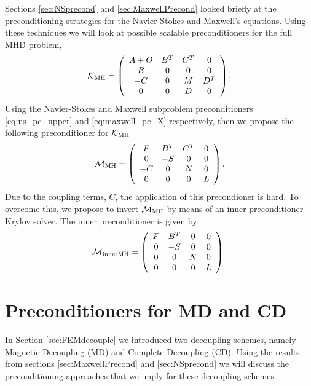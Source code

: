 Sections \ref{sec:NSprecond} and \ref{sec:MaxwellPrecond} looked briefly at the preconditioning strategies for the Navier-Stokes and Maxwell's equations. Using these techniques we will look at possible scalable preconditioners for the full MHD problem,
\begin{equation}
    {\mathcal K}_{\rm MH} = \left(
\begin{array}{cccc}
A+O & B^T & C^T & 0\\
B & 0 & 0 & 0\\
-C & 0 & M & D^T \\
0 & 0 & D & 0
\end{array}
\right).
\end{equation}
Using the Navier-Stokes and Maxwell subproblem preconditioners \eqref{eq:ns_pc_upper} and \eqref{eq:maxwell_pc_X} respectively, then we propose the following preconditioner for ${\mathcal K}_{\rm MH}$
\begin{equation}
\label{eq:mhd_pc_ls}
\mathcal{M}_{\rm MH} =
\left(
\begin{array}{cccc}
F & B^T & C^T & 0\\
0 & -S & 0 & 0 \\
-C & 0 & N & 0\\
0 & 0 & 0 & L
\end{array}
\right).
\end{equation}
Due to the coupling terms, $C$, the application of this precondioner is hard. To overcome this, we propose to invert  $\mathcal{M}_{\rm MH}$ by means of an inner preconditioner Krylov solver. The inner preconditioner is given by
\begin{equation}
\label{eq:mhd_pc_inner}
\mathcal{M}_{\rm innerMH} =
\left(
\begin{array}{cccc}
F & B^T & 0 & 0\\
0 & -{S} & 0 & 0 \\
0 & 0 & N & 0\\
0 & 0 & 0 & L
\end{array}
\right).
\end{equation}

\section{Preconditioners for MD and CD}

In Section \ref{sec:FEMdecouple} we introduced two decoupling schemes, namely Magnetic Decoupling (MD) and Complete Decoupling (CD). Using the results from sections \ref{sec:MaxwellPrecond} and \ref{sec:NSprecond} we will discuss the preconditioning approaches that we imply for these decoupling schemes.

